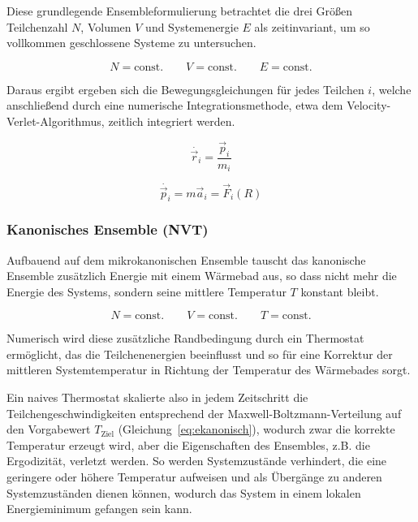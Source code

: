 Diese grundlegende Ensembleformulierung betrachtet die drei Größen Teilchenzahl $N$, Volumen $V$ und Systemenergie $E$ als zeitinvariant, um so vollkommen geschlossene Systeme zu untersuchen.

\begin{equation}
  N = \text{const.}
  \qquad
  V = \text{const.}
  \qquad
  E = \text{const.}
\end{equation}

Daraus ergibt ergeben sich die Bewegungsgleichungen für jedes Teilchen $i$, welche anschließend durch eine numerische Integrationsmethode, etwa dem Velocity-Verlet-Algorithmus, zeitlich integriert werden.

\begin{equation}
  \dot{\vec r_i} = \frac{\vec p_i}{m_i}
\end{equation}

\begin{equation}
  \dot{\vec p_i} = m \vec a_i = \vec F_i(R)
\end{equation}

\subsubsection{Kanonisches Ensemble (NVT)}

Aufbauend auf dem mikrokanonischen Ensemble tauscht das kanonische Ensemble zusätzlich Energie mit einem Wärmebad aus, so dass nicht mehr die Energie des Systems, sondern seine mittlere Temperatur $T$ konstant bleibt.

\begin{equation}
  N = \text{const.}
  \qquad
  V = \text{const.}
  \qquad
  T = \text{const.}
\end{equation}

Numerisch wird diese zusätzliche Randbedingung durch ein Thermostat ermöglicht, das die Teilchenenergien beeinflusst und so für eine Korrektur der mittleren Systemtemperatur in Richtung der Temperatur des Wärmebades sorgt.

Ein naives Thermostat skalierte also in jedem Zeitschritt die Teilchengeschwindigkeiten entsprechend der Maxwell-Boltzmann-Verteilung auf den Vorgabewert $T_\text{Ziel}$ (Gleichung~\ref{eq:ekanonisch}), wodurch zwar die korrekte Temperatur erzeugt wird, aber die Eigenschaften des Ensembles, z.B. die Ergodizität, verletzt werden.
So werden Systemzustände verhindert, die eine geringere oder höhere Temperatur aufweisen und als Übergänge zu anderen Systemzuständen dienen können, wodurch das System in einem lokalen Energieminimum gefangen sein kann.

